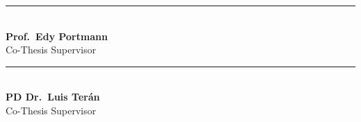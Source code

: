 \begin{flushleft}
\vspace{0.07\textheight}

\noindent
\begin{minipage}[t]{0.44\textwidth}
  \centering
  \rule{0.85\textwidth}{0.4pt}\\[0.3em]
  \textbf{Prof.\ Edy Portmann}\\
  Co-Thesis Supervisor
\end{minipage}\hfill
\begin{minipage}[t]{0.44\textwidth}
  \centering
  \rule{0.85\textwidth}{0.4pt}\\[0.3em]
  \textbf{PD Dr.\ Luis Ter\'an}\\
  Co-Thesis Supervisor
\end{minipage}

\end{flushleft}

\clearpage
